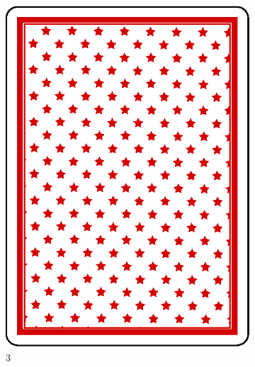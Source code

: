 \documentclass[10pt]{beamer}
\begin{document}
\begin{frame}
\begin{columns}
\begin{column}{7cm}
\begin{figure}
\begin{subfigure}{.15\linewidth}
      \includegraphics[width=\linewidth]{im/back.eps}
      \caption{3}
     \end{subfigure}
     \begin{subfigure}{.15\linewidth}

\end{subfigure}
\end{figure}
\end{column}
\end{columns}
\end{frame}
\end{document}
